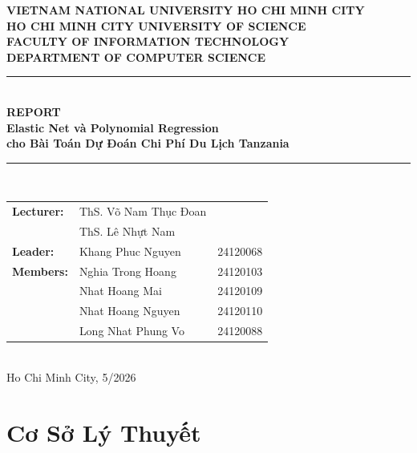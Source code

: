 \documentclass[12pt,a4paper]{article}
\begin{document}
\begin{titlepage}
\centering
\textbf{\large VIETNAM NATIONAL UNIVERSITY HO CHI MINH CITY}\\
\textbf{\large HO CHI MINH CITY UNIVERSITY OF SCIENCE}\\
\textbf{\large FACULTY OF INFORMATION TECHNOLOGY}\\[0.5cm]
\textbf{\large DEPARTMENT OF COMPUTER SCIENCE}\\[2cm]

\rule{\textwidth}{1pt}\\[0.5cm]
\textbf{\LARGE REPORT}\\[0.3cm]
\textbf{\Large Elastic Net và Polynomial Regression}\\[0.2cm]
\textbf{\Large cho Bài Toán Dự Đoán Chi Phí Du Lịch Tanzania}\\[0.3cm]
\rule{\textwidth}{1pt}\\[2cm]

\begin{tabular}{l l l}
\textbf{Lecturer:} & ThS. Võ Nam Thục Đoan & \\
                   & ThS. Lê Nhựt Nam & \\[0.3cm]
\textbf{Leader:}   & Khang Phuc Nguyen & 24120068 \\
\textbf{Members:}  & Nghia Trong Hoang & 24120103 \\
                   & Nhat Hoang Mai    & 24120109 \\
                   & Nhat Hoang Nguyen & 24120110 \\
                   & Long Nhat Phung Vo & 24120088 \\
\end{tabular}\\[3cm]

Ho Chi Minh City, 5/2026
\end{titlepage}

\tableofcontents
\newpage

\section{Cơ Sở Lý Thuyết}
\end{document}
